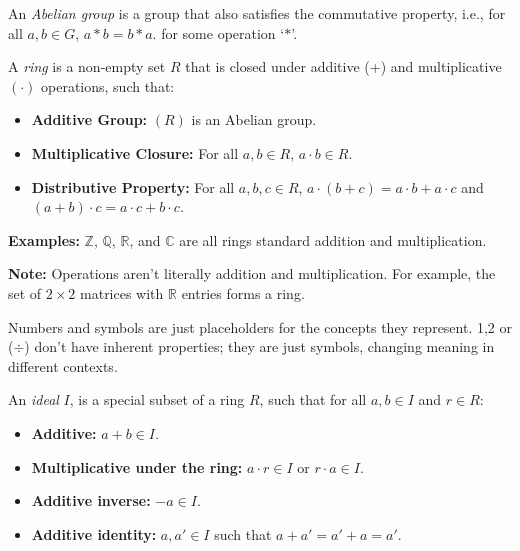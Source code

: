 \begin{Def}

    An \textit{Abelian group} is a group that also satisfies the commutative property, i.e., for all $a,b\in G$, $a*b=b*a$.
    for some operation `$*$'.

\end{Def}

\begin{Def}[Ring]

    A \textit{ring} is a non-empty set $R$ that is closed under additive (+) and multiplicative $(\cdot)$ operations, such that:
    \begin{itemize}
        \item \textbf{Additive Group:} $(R)$ is an Abelian group.
        \item \textbf{Multiplicative Closure:} For all $a,b\in R$, $a\cdot b\in R$.
        \item \textbf{Distributive Property:} For all $a,b,c\in R$, $a\cdot(b+c)=a\cdot b+a\cdot c$ and $(a+b)\cdot c=a\cdot c+b\cdot c$.
    \end{itemize}
\end{Def}

\noindent
\textbf{Examples:} $\mathbb{Z}$, $\mathbb{Q}$, $\mathbb{R}$, and $\mathbb{C}$ are all rings standard addition and multiplication.\\

\begin{Note}
    \textbf{Note:} Operations aren't literally addition and multiplication. For example,
    the set of $2\times2$ matrices with $\mathbb{R}$ entries forms a ring.
\end{Note}
\begin{Tip}
    Numbers and symbols are just placeholders for the concepts they represent.
    1,2 or ($\div$) don't have inherent properties; they are just symbols, changing meaning
    in different contexts.
\end{Tip}

\newpage

\begin{Def}[Ideal]

    \label{def:ideal}

    An \textit{ideal} $I$, is a special subset of a ring $R$, such that for all $a,b\in I$ and $r\in R$:
    \begin{itemize}
        \item \textbf{Additive:} $a+b\in I$.
        \item \textbf{Multiplicative under the ring:} $a\cdot r\in I$ or $r\cdot a\in I$.
        \item \textbf{Additive inverse:} $-a\in I$.
        \item \textbf{Additive identity:} $a,a'\in I$ such that $a+a'=a'+a=a'$.
    \end{itemize}
\end{Def}

